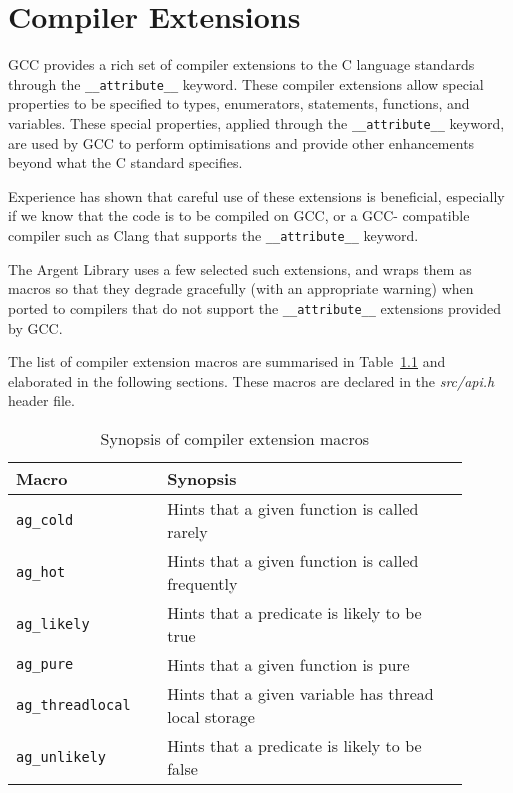 \chapter{Compiler Extensions}

GCC provides a rich set of compiler extensions to the C language standards
through the \texttt{\_\_attribute\_\_} keyword. These compiler extensions allow 
special properties to be specified to types, enumerators, statements, functions, 
and variables. These special properties, applied through the 
\texttt{\_\_attribute\_\_} keyword, are used by GCC to perform optimisations and
provide other enhancements beyond what the C standard specifies.

Experience has shown that careful use of these extensions is beneficial,
especially if we know that the code is to be compiled on GCC, or a GCC-
compatible compiler such as Clang that supports the 
\texttt{\_\_attribute\_\_} keyword.

The Argent Library uses a few selected such extensions, and wraps them as macros
so that they degrade gracefully (with an appropriate warning) when ported to 
compilers that do not support the \texttt{\_\_attribute\_\_} extensions provided
by GCC.

The list of compiler extension macros are summarised in Table~\ref{tab:synopsis}
and elaborated in the following sections. These macros are declared in the
\emph{src/api.h} header file.

\renewcommand\arraystretch{1.1}
\begin{table}[!htbp]
\centering
\small
\begin{tabular}[t]{>{\centering}m{0.3\linewidth}
    >{\raggedright\arraybackslash}m{0.6\linewidth}}
\toprule
\textbf{Macro} & \textbf{Synopsis} \\
\midrule
\texttt{ag\_cold} & Hints that a given function is called rarely \\
\texttt{ag\_hot} & Hints that a given function is called frequently \\
\texttt{ag\_likely} & Hints that a predicate is likely to be true \\
\texttt{ag\_pure} & Hints that a given function is pure \\
\texttt{ag\_threadlocal} & Hints that a given variable has thread local 
    storage \\
\texttt{ag\_unlikely} & Hints that a predicate is likely to be false \\
\bottomrule
\end{tabular}
\caption{Synopsis of compiler extension macros}
\label{tab:synopsis}
\end{table}


